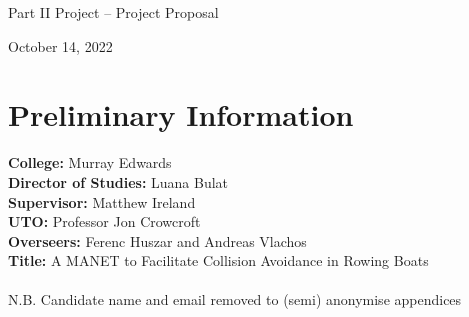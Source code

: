 \documentclass[10pt, a4paper]{article}
\begin{document}
\begin{center}
\Huge{Part II Project -- Project Proposal} \par
\Large{October 14, 2022} \par
\end{center}
\par
\par

\section*{Preliminary Information}
\textbf{College:} Murray Edwards \\
\textbf{Director of Studies:} Luana Bulat \\
\textbf{Supervisor:} Matthew Ireland \\
\textbf{UTO:} Professor Jon Crowcroft\\
\textbf{Overseers:}  Ferenc Huszar and Andreas Vlachos \\
\textbf{Title:} A MANET to Facilitate Collision Avoidance in Rowing Boats \\ \\ 
N.B. Candidate name and email removed to (semi) anonymise appendices
\end{document}
